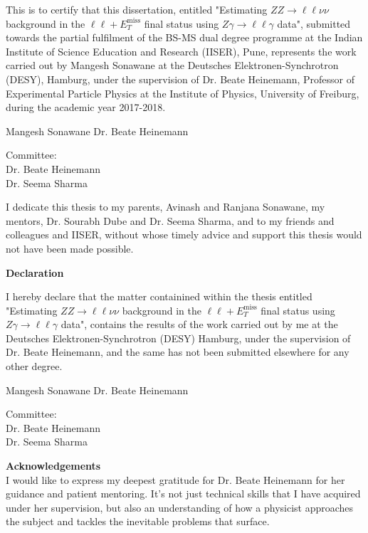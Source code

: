 \documentclass[11pt,a4paper,openright,twoside]{report}
\newcommand{\ZZ}{$ZZ\to \ell\ell\nu\nu$ }
\newcommand{\Zg}{$Z\gamma\to \ell\ell\gamma$ }
\newcommand{\llM}{$\ell\ell+E_T^{\mathrm{miss}}$ }
\newcommand\blankpage{%
    \null
    \thispagestyle{empty}%
    \addtocounter{page}{-1}%
    \newpage}
\begin{document}
\vspace{1cm}
\normalsize This is to certify that this dissertation, entitled "Estimating \ZZ background in the \llM final status using \Zg data", submitted towards the partial fulfilment of the BS-MS dual degree programme at the Indian Institute of Science Education and Research (IISER), Pune, represents the work carried out by Mangesh Sonawane at the Deutsches Elektronen-Synchrotron (DESY), Hamburg, under the supervision of Dr. Beate Heinemann, Professor of Experimental Particle Physics at the Institute of Physics, University of Freiburg, during the academic year 2017-2018.
\vfill
\begin{center}
Mangesh Sonawane\hspace{8cm}
Dr. Beate Heinemann
\end{center}
\vfill
Committee:\\
Dr. Beate Heinemann\\
Dr. Seema Sharma
\vfill
\vfill
\newpage
\blankpage
\newpage
{}
\vspace*{\fill}
\noindent I dedicate this thesis to my parents, Avinash and Ranjana Sonawane, my mentors, Dr. Sourabh Dube and Dr. Seema Sharma, and to my friends and colleagues and IISER, without whose timely advice and support this thesis would not have been made possible.
\vspace*{\fill}
\newpage
\blankpage
\newpage
\begin{center}
\Huge \textbf{Declaration\\}
\end{center}
\vspace{1cm}
\normalsize I hereby declare that the matter containined within the thesis entitled "Estimating \ZZ background in the \llM final status using \Zg data", contains the results of the work carried out by me at the Deutsches Elektronen-Synchrotron (DESY) Hamburg, under the supervision of Dr. Beate Heinemann, and the same has not been submitted elsewhere for any other degree.
\vfill
\begin{center}
Mangesh Sonawane\hspace{8cm}
Dr. Beate Heinemann
\end{center}
\vfill
Committee:\\
Dr. Beate Heinemann\\
Dr. Seema Sharma
\vfill
\vfill
\newpage
\blankpage
\newpage
{\Huge \textbf{Acknowledgements\vspace{2cm}\\}}
I would like to express my deepest gratitude for Dr. Beate Heinemann for her guidance and patient mentoring. It's not just technical skills that I have acquired under her supervision, but also an understanding of how a physicist approaches the subject and tackles the inevitable problems that surface.\vspace{1cm}
\end{document}
